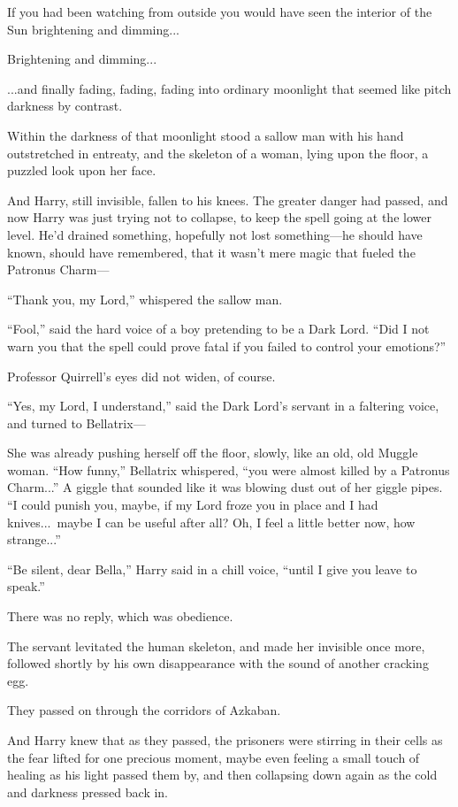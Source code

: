 If you had been watching from outside you would have seen the interior of the Sun brightening and dimming...

Brightening and dimming...

...and finally fading, fading, fading into ordinary moonlight that seemed like pitch darkness by contrast.

Within the darkness of that moonlight stood a sallow man with his hand outstretched in entreaty, and the skeleton of a woman, lying upon the floor, a puzzled look upon her face.

And Harry, still invisible, fallen to his knees. The greater danger had passed, and now Harry was just trying not to collapse, to keep the spell going at the lower level. He’d drained something, hopefully not lost something—he should have known, should have remembered, that it wasn’t mere magic that fueled the Patronus Charm—

“Thank you, my Lord,” whispered the sallow man.

“Fool,” said the hard voice of a boy pretending to be a Dark Lord. “Did I not warn you that the spell could prove fatal if you failed to control your emotions?”

Professor Quirrell’s eyes did not widen, of course.

“Yes, my Lord, I understand,” said the Dark Lord’s servant in a faltering voice, and turned to Bellatrix—

She was already pushing herself off the floor, slowly, like an old, old Muggle woman. “How funny,” Bellatrix whispered, “you were almost killed by a Patronus Charm...” A giggle that sounded like it was blowing dust out of her giggle pipes. “I could punish you, maybe, if my Lord froze you in place and I had knives...\ maybe I can be useful after all? Oh, I feel a little better now, how strange...”

“Be silent, dear Bella,” Harry said in a chill voice, “until I give you leave to speak.”

There was no reply, which was obedience.

The servant levitated the human skeleton, and made her invisible once more, followed shortly by his own disappearance with the sound of another cracking egg.

They passed on through the corridors of Azkaban.

And Harry knew that as they passed, the prisoners were stirring in their cells as the fear lifted for one precious moment, maybe even feeling a small touch of healing as his light passed them by, and then collapsing down again as the cold and darkness pressed back in.

